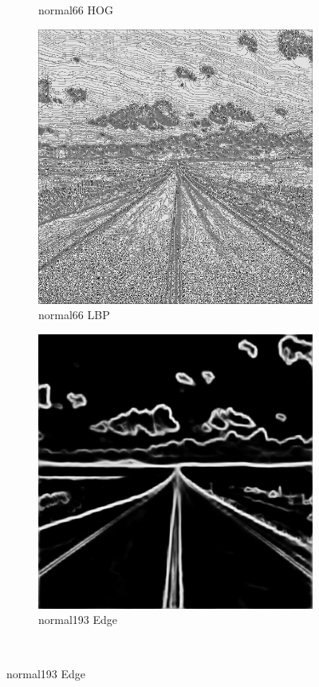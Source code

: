 \documentclass[a4paper, 10pt]{article}
\begin{document}
\begin{figure}[htbp]
\begin{subfigure}{0.24\textwidth}
			\caption*{normal66 HOG}
			\label{fig: normal66 HOG}
		\end{subfigure}	
		\begin{subfigure}{0.24\textwidth}
			\includegraphics[width=\linewidth]{picture/alldata_lbp/normal66}
			\caption*{normal66 LBP}
			\label{fig: normal66 LBP}
		\end{subfigure}
		\begin{subfigure}{0.24\textwidth}
			\includegraphics[width=\linewidth]{picture/alldata_edge/normal66}
			\caption*{normal193 Edge}
			\label{fig: normal66 Edge}
		\end{subfigure}	\\
		

\end{figure}
\end{document}
